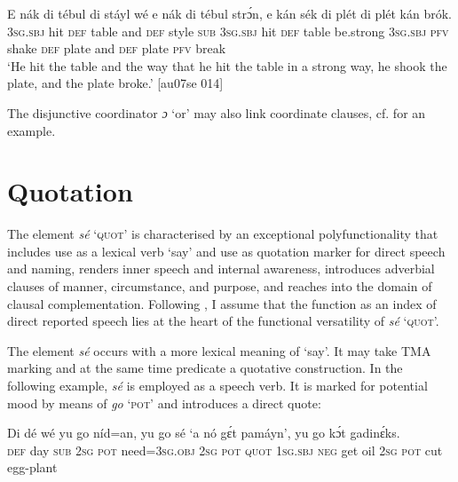\ea%
    \label{ex:key:1365}
    \gll E    nák  di  tébul    di  stáyl  wé  e    nák  di  tébul  strɔ́n,
e    kán  sék    di  plét      di  plét    kán  brók.\\
\textsc{3sg.sbj}  hit  \textsc{def}  table  and  \textsc{def}  style  \textsc{sub}  \textsc{3sg.sbj}  hit  \textsc{def}  table  be.strong
\textsc{3sg.sbj}  \textsc{pfv}  shake  \textsc{def}  plate  and  \textsc{def}  plate  \textsc{pfv}  break\\

\glt ‘He hit the table and the way that he hit the table in a strong way, 
he shook the plate, and the plate broke.’ [au07se 014]
\z

The disjunctive coordinator \textit{ɔ} ‘or’ may also link coordinate clauses, cf.  for an example.

\section{Quotation}\label{sec:10.4}

The element \textit{sé} ‘\textsc{quot}’ is characterised by an exceptional polyfunctionality that includes use as a lexical verb ‘say’ and use as quotation marker for direct speech and naming, renders inner speech and internal awareness, introduces adverbial clauses of manner, circumstance, and purpose, and reaches into the domain of clausal complementation. Following \citep{Güldemann2008}, I assume that the function as an index of direct reported speech lies at the heart of the functional versatility of \textit{sé} ‘\textsc{quot}’. 


The element \textit{sé} occurs with a more lexical meaning of ‘say’. It may take \textsc{TMA} marking and at the same time predicate a quotative construction. In the following example, \textit{sé} is employed as a speech verb. It is marked for potential mood by means of \textit{go} ‘\textsc{pot}’ and introduces a direct quote: 



\ea%
    \label{ex:key:1366}
    \gll Di  dé  wé  yu  go  níd=an,    yu  go  sé    ‘a    nó  gɛ́t  pamáyn’,
yu  go  kɔ́t  gadinɛ́ks.\\
\textsc{def}  day  \textsc{sub}  \textsc{2sg}  \textsc{pot}  need=\textsc{3sg.obj}  \textsc{2sg}  \textsc{pot}  \textsc{quot}    \textsc{1sg.sbj}  \textsc{neg}  get  oil
\textsc{2sg}  \textsc{pot}  cut  egg-plant\\

